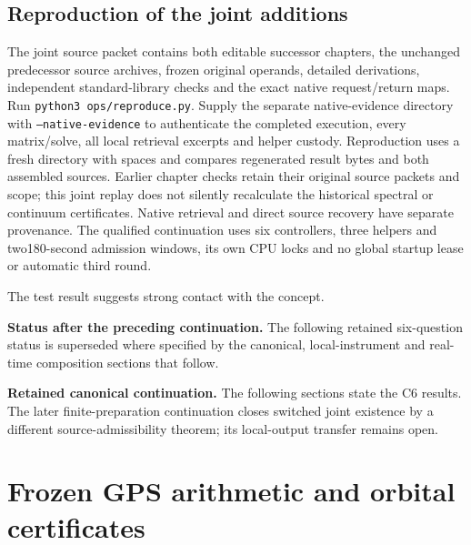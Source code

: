 \documentclass[10pt,twocolumn,letterpaper]{article}
\begin{document}
\subsection{Reproduction of the joint additions}
The joint source packet contains both editable successor chapters, the
unchanged predecessor source archives, frozen original operands, detailed
derivations, independent standard-library checks and the exact native
request/return maps. Run \texttt{python3 ops/reproduce.py}. Supply the separate
native-evidence directory with \texttt{--native-evidence} to authenticate
the completed execution, every matrix/solve, all local retrieval excerpts
and helper custody. Reproduction uses a fresh directory with spaces and
compares regenerated result bytes and both assembled sources.
Earlier chapter checks retain their original source packets and scope;
this joint replay does not silently recalculate the historical spectral
or continuum certificates. Native retrieval and direct source recovery
have separate provenance. The qualified continuation uses six controllers,
three helpers and two180-second admission windows, its own CPU locks and
no global startup lease or automatic third round.

The test result suggests strong contact with the concept.





\par\noindent\textbf{Status after the preceding continuation.} The following retained six-question status is superseded where specified by the canonical, local-instrument and real-time composition sections that follow.\par

\par\noindent\textbf{Retained canonical continuation.} The following sections state the C6 results. The later finite-preparation continuation closes switched joint existence by a different source-admissibility theorem; its local-output transfer remains open.\par








\appendix
\section{Frozen GPS arithmetic and orbital certificates}\label{app:orbit}
\end{document}
